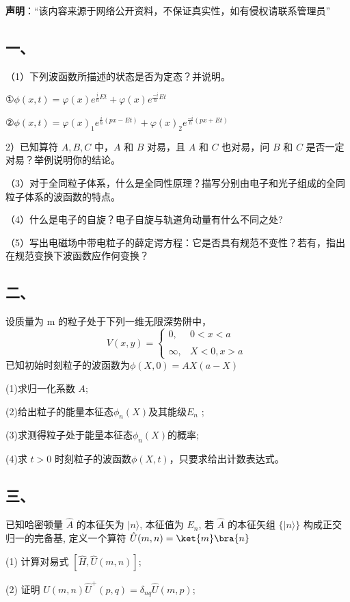 
\textbf{声明}：“该内容来源于网络公开资料，不保证真实性，如有侵权请联系管理员”

\subsection{一、}
（1）下列波函数所描述的状态是否为定态？并说明。

①$\phi(x,t)=\varphi(x)e^{\frac{i}{\hbar}Et}+\varphi(x)e^{\frac{-i}{\hbar}Et}$

②$\phi(x,t)=\varphi(x)_1e^{\frac{i}{\hbar}(px-Et)}+\varphi(x)_2e^{\frac{-i}{\hbar}(px+Et)}$

2）已知算符 $A,B,C$ 中，$A$ 和 $B$ 对易，且 $A$ 和 $C$ 也对易，问 $B$ 和 $C$ 是否一定对易？举例说明你的结论。

（3）对于全同粒子体系，什么是全同性原理？描写分别由电子和光子组成的全同粒子体系的波函数的特点。

（4）什么是电子的自旋？电子自旋与轨道角动量有什么不同之处?

（5）写出电磁场中带电粒子的薛定谔方程：它是否具有规范不变性？若有，指出在规范变换下波函数应作何变换？
\subsection{二、}
设质量为 m 的粒子处于下列一维无限深势阱中，
$$V(x,y)=\begin{cases}
0,&0 < x <a \\\\
\infty ,& X < 0,  x>a 
\end{cases}~
$$
已知初始时刻粒子的波函数为$\phi(X,0)=AX(a-X)$

(1)求归一化系数 $A$;

(2)给出粒子的能量本征态$\phi_n(X)$及其能级$E_n$ ;

(3)求测得粒子处于能量本征态$\phi_n(X)$的概率;

(4)求 $t>0$ 时刻粒子的波函数$\phi(X,t)$，只要求给出计数表达式。
\subsection{三、}
已知哈密顿量 $\hat{A}$ 的本征矢为 $|n\rangle$, 本征值为 $E_n$, 若 $\hat{A}$ 的本征矢组 $\{|n\rangle\}$ 构成正交归一的完备基, 定义一个算符 $\hat{U}(m,n)=\ket{m}\bra{n}$

(1) 计算对易式 $\left[\hat{H}, \hat{U}(m,n)\right]$;

(2) 证明 $\hat{U}(m,n)\hat{U}^+(p,q) = \delta_{nq} \hat{U}(m,p)$;

